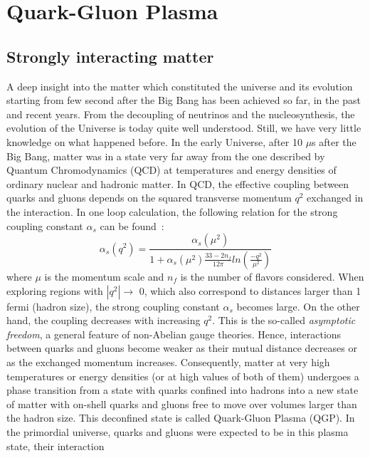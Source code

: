 
\chapter{Quark-Gluon Plasma} %
\label{Chapter1} %

\section{Strongly interacting matter}
\label{sec:Intro}
A deep insight into the matter which constituted the universe and its evolution
starting from few second after the Big Bang has been achieved so far, in the past and recent years.
From the decoupling of neutrinos 
and the nucleosynthesis, the evolution of the Universe is today quite well
understood. Still, we have very little knowledge on what happened before.
In the early Universe, after 10 $\mu$s after the Big Bang, matter was in a state very far away from the one described by Quantum 
Chromodynamics (QCD) at temperatures and energy densities 
of ordinary nuclear and hadronic matter. 
In QCD, the effective coupling between quarks 
and gluons depends on the squared transverse momentum $q^2$ exchanged
 in the interaction. In one loop calculation, the following relation for the
 strong coupling constant $\alpha_s$ can be found~\cite{Wilson:1970ag}:
\begin{equation}
\alpha_s(q^2)=\frac{\alpha_s (\mu^2)}{1+\alpha_s (\mu^2) \frac{33-2n_f}{12\pi}ln(\frac{-q^2}{\mu^2})}
\end{equation}
where $\mu$ is the momentum scale and $n_f$ is the number of flavors 
considered. When exploring regions with $|q^2|\rightarrow$ 0, which also 
correspond to distances larger than 1 fermi (hadron size), the strong 
coupling constant $\alpha_s$ becomes large. On the other hand, the coupling 
decreases with increasing $q^2$. This is the so-called {\it asymptotic freedom}, 
a general feature of non-Abelian gauge theories. Hence, interactions between 
quarks and gluons become weaker as their mutual distance decreases or as the 
exchanged momentum increases.
Consequently, matter at very high temperatures or energy densities (or at high values 
of both of them) undergoes a phase transition from a state with quarks confined into 
hadrons into a new state of matter with on-shell quarks and gluons free to move over
volumes larger than the hadron size. This deconfined state is called Quark-Gluon Plasma (QGP).
In the primordial universe, quarks and gluons were expected to be in this plasma state, their interaction 
